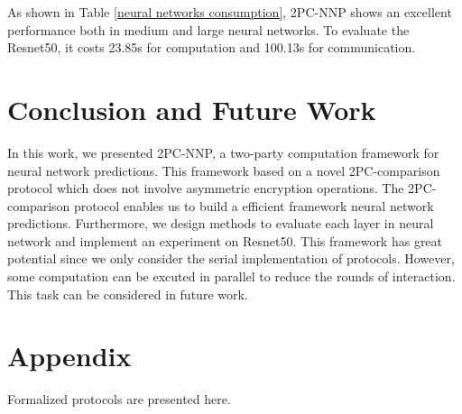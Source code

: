 \documentclass[letterpaper]{article} %
\begin{document}
    \begin{table}[!ht]

        \center
        \caption{Experiment III-Neural networks consumption}
        \label{neural networks consumption}
    \end{table}

    As shown in Table \ref{neural networks consumption}, 2PC-NNP shows an excellent performance
    both in medium and large neural networks. To evaluate the Resnet50,
    it costs 23.85s for computation and 100.13s for communication.

    \section{Conclusion and Future Work}
    In this work, we presented 2PC-NNP, a two-party computation framework for neural network predictions.
    This framework based on a novel 2PC-comparison protocol which does not involve asymmetric encryption operations.
    The 2PC-comparison protocol enables us to build a efficient framework neural network predictions.
    Furthermore, we design methods to evaluate each layer in neural network and implement an experiment on Resnet50.
    This framework has great potential since we only consider the serial implementation of protocols.
    However, some computation can be excuted in parallel to reduce the rounds of interaction.
    This task can be considered in future work.
    \section{Appendix}
    Formalized protocols are presented here.
\end{document}
